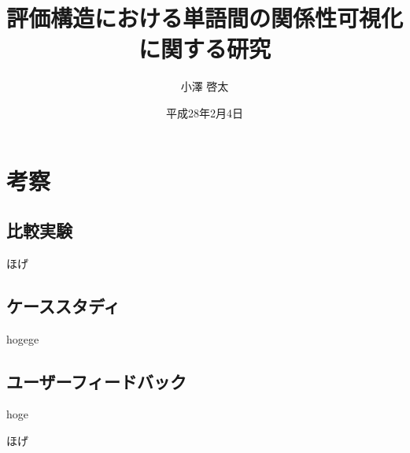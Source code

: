 \documentclass[syuuron]{kuee}
\title{評価構造における単語間の関係性可視化に関する研究}
\author{小澤 啓太}
\date{平成28年2月4日}
\begin{document}
\maketitle
\tableofcontents

			
\chapter{考察}
	\section{比較実験}
	ほげ
	\section{ケーススタディ}%
	hogege
	\section{ユーザーフィードバック}
	hoge

\begin{acknowledgements}
	ほげ
\end{acknowledgements}
\end{document}
